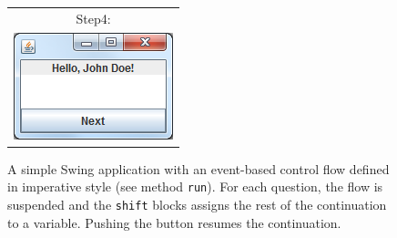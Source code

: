 \begin{figure}
\begin{minipage}{.3\linewidth}
\begin{tabular}{c}
Step4:\\
\includegraphics[width=0.9\linewidth]{images/swing-demo-step4.png} \\
\end{tabular}

    \end{minipage} 


\caption{A simple Swing application with an event-based control flow defined in imperative style (see method \texttt{run}). For each question, the flow is suspended and the \texttt{shift} blocks assigns the rest of the continuation to a variable. Pushing the button resumes the continuation.}
\label{fig:example_twelve_days}
\end{figure}










